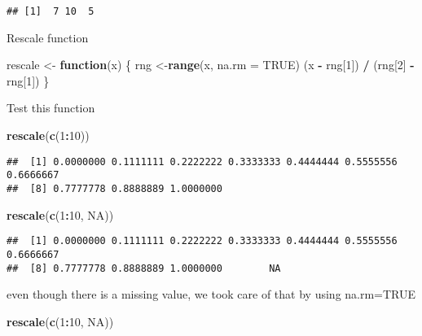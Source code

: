 \documentclass[]{article}
\newenvironment{Shaded}{\begin{snugshade}}{\end{snugshade}}
\newcommand{\ControlFlowTok}[1]{\textcolor[rgb]{0.13,0.29,0.53}{\textbf{#1}}}
\newcommand{\DataTypeTok}[1]{\textcolor[rgb]{0.13,0.29,0.53}{#1}}
\newcommand{\DecValTok}[1]{\textcolor[rgb]{0.00,0.00,0.81}{#1}}
\newcommand{\KeywordTok}[1]{\textcolor[rgb]{0.13,0.29,0.53}{\textbf{#1}}}
\newcommand{\NormalTok}[1]{#1}
\newcommand{\OperatorTok}[1]{\textcolor[rgb]{0.81,0.36,0.00}{\textbf{#1}}}
\newcommand{\OtherTok}[1]{\textcolor[rgb]{0.56,0.35,0.01}{#1}}
\newcommand{\StringTok}[1]{\textcolor[rgb]{0.31,0.60,0.02}{#1}}
\begin{document}
\begin{verbatim}
## [1]  7 10  5
\end{verbatim}

Rescale function

\begin{Shaded}
\begin{Highlighting}[]
\NormalTok{rescale <-}\StringTok{ }\ControlFlowTok{function}\NormalTok{(x) \{}
\NormalTok{  rng <-}\KeywordTok{range}\NormalTok{(x, }\DataTypeTok{na.rm =} \OtherTok{TRUE}\NormalTok{)  }
\NormalTok{  (x }\OperatorTok{-}\StringTok{ }\NormalTok{rng[}\DecValTok{1}\NormalTok{]) }\OperatorTok{/}\StringTok{ }\NormalTok{(rng[}\DecValTok{2}\NormalTok{] }\OperatorTok{-}\StringTok{ }\NormalTok{rng[}\DecValTok{1}\NormalTok{])}
\NormalTok{\}}
\end{Highlighting}
\end{Shaded}

Test this function

\begin{Shaded}
\begin{Highlighting}[]
\KeywordTok{rescale}\NormalTok{(}\KeywordTok{c}\NormalTok{(}\DecValTok{1}\OperatorTok{:}\DecValTok{10}\NormalTok{))}
\end{Highlighting}
\end{Shaded}

\begin{verbatim}
##  [1] 0.0000000 0.1111111 0.2222222 0.3333333 0.4444444 0.5555556 0.6666667
##  [8] 0.7777778 0.8888889 1.0000000
\end{verbatim}

\begin{Shaded}
\begin{Highlighting}[]
\KeywordTok{rescale}\NormalTok{(}\KeywordTok{c}\NormalTok{(}\DecValTok{1}\OperatorTok{:}\DecValTok{10}\NormalTok{, }\OtherTok{NA}\NormalTok{))}
\end{Highlighting}
\end{Shaded}

\begin{verbatim}
##  [1] 0.0000000 0.1111111 0.2222222 0.3333333 0.4444444 0.5555556 0.6666667
##  [8] 0.7777778 0.8888889 1.0000000        NA
\end{verbatim}

even though there is a missing value, we took care of that by using
na.rm=TRUE

\begin{Shaded}
\begin{Highlighting}[]
\KeywordTok{rescale}\NormalTok{(}\KeywordTok{c}\NormalTok{(}\DecValTok{1}\OperatorTok{:}\DecValTok{10}\NormalTok{, }\OtherTok{NA}\NormalTok{))}
\end{Highlighting}
\end{Shaded}
\end{document}
